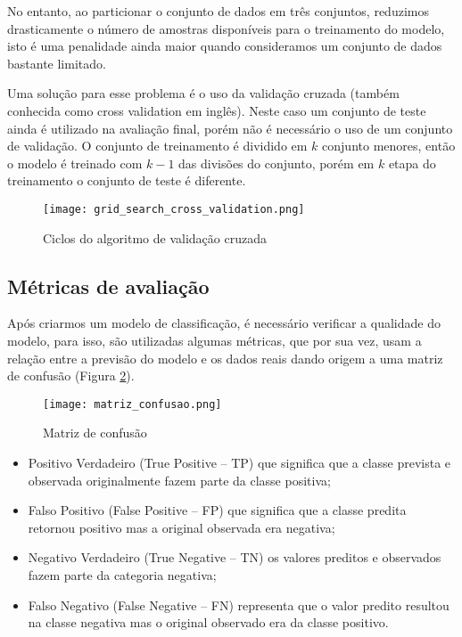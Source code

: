 No entanto, ao particionar o conjunto de dados em três conjuntos, reduzimos drasticamente o número de amostras disponíveis para o treinamento do modelo, isto é uma penalidade ainda maior quando consideramos um conjunto de dados bastante limitado.

\pagebreak

Uma solução para esse problema é o uso da validação cruzada (também conhecida como cross validation em inglês). Neste caso um conjunto de teste ainda é utilizado na avaliação final, porém não é necessário o uso de um conjunto de validação. O conjunto de treinamento é dividido em $k$ conjunto menores, então o modelo é treinado com $k-1$ das divisões do conjunto, porém em $k$ etapa do treinamento o conjunto de teste é diferente\cite{art:cross-validation}.


\begin{figure}[ht]
    \centering
    \texttt{[image: grid\_search\_cross\_validation.png]} 
    \caption{Ciclos do algoritmo de validação cruzada}
    \label{fig:crossv}
\end{figure}
\FloatBarrier



\subsection{Métricas de avaliação}\label{sec:LABEL_CHP_4_SEC_A_SUB_H}

Após criarmos um modelo de classificação, é necessário verificar a qualidade do modelo, para isso, são utilizadas algumas métricas, que por sua vez, usam a relação entre a previsão do modelo e os dados reais dando origem a uma matriz de confusão (Figura \ref{fig:matriz_confusao}).

\begin{figure}[ht]
    \centering
    \texttt{[image: matriz\_confusao.png]} 
    \caption{Matriz de confusão}
    \label{fig:matriz_confusao}
\end{figure}
\FloatBarrier

\begin{itemize}
    \item Positivo Verdadeiro (True Positive – TP) que significa que a classe prevista e observada originalmente fazem parte da classe positiva;
    \item Falso Positivo (False Positive – FP) que significa que a classe predita retornou positivo mas a original observada era negativa;
    \item Negativo Verdadeiro (True Negative – TN) os valores preditos e observados fazem parte da categoria negativa;
    \item Falso Negativo (False Negative – FN) representa que o valor predito resultou na classe negativa mas o original observado era da classe positivo.
\end{itemize}

